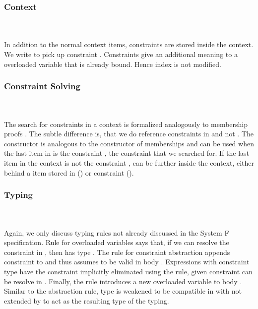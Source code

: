 \subsubsection{Context}\hfill\\\\
In addition to the normal context items, constraints are stored inside the context.
\FoCtx
We write    to pick up constraint . 
Constraints give an additional meaning to a overloaded variable that is already bound. Hence index  is not modified.

\subsubsection{Constraint Solving}\hfill\\\\
The search for constraints in a context is formalized analogously to membership proofs   . The subtle difference is, that we do reference constraints in  and not . 
\FoCstrSolve
The  constructor is analogous to the  constructor of memberships and can be used when the last item in  is the constraint , the constraint that we searched for. 
If the last item in the context is not the constraint ,  can be further inside the context, either behind a item stored in  () or constraint (). 

\subsubsection{Typing}\hfill\\\\
Again, we only discuss typing rules not already discussed in the System F specification. 
\FoTyping
Rule  for overloaded variables says that, if we can resolve the constraint  \Constr{:}  in , then  has type . 
The rule for constraint abstraction  appends constraint  to  and thus assumes  to be valid in body . 
Expressions  with constraint type \Constr{[}  \Constr{]⇒}  have the constraint implicitly eliminated using the  rule, given constraint  can be resolve in . 
Finally, the rule  introduces a new overloaded variable to body . Similar to the abstraction rule, type  is weakened to be compatible in  with  not extended by  to act as the resulting type of the typing.

